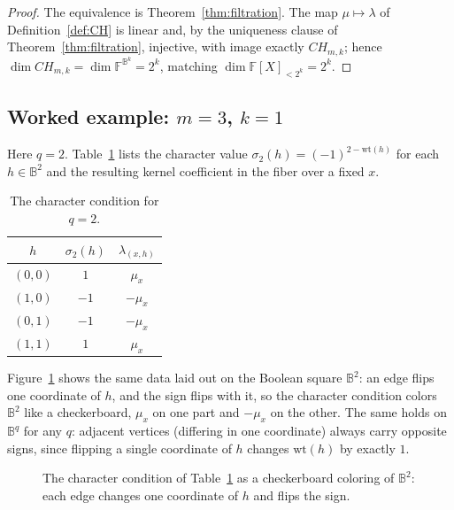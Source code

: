 \documentclass[preprint,3p,12pt,numbers]{elsarticle}
\theoremstyle{definition}
\theoremstyle{remark}
\newcommand{\wt}{\mathrm{wt}}
\begin{document}
\begin{proof}
The equivalence is Theorem~\ref{thm:filtration}. The map
$\mu \mapsto \lambda$ of Definition~\ref{def:CH} is linear and, by the
uniqueness clause of Theorem~\ref{thm:filtration}, injective, with image
exactly $CH_{m,k}$; hence $\dim CH_{m,k} = \dim \mathbb{F}^{\mathbb{B}^k}
= 2^k$, matching $\dim \mathbb{F}[X]_{<2^k}=2^k$.
\end{proof}

\subsection{Worked example: $m=3$, $k=1$}
\label{subsec:example-filt}

Here $q=2$. Table~\ref{tab:example} lists the character value
$\sigma_2(h)=(-1)^{2-\wt(h)}$ for each $h \in \mathbb{B}^2$ and the
resulting kernel coefficient in the fiber over a fixed $x$.

\begin{table}[h]
\centering
\begin{tabular}{ccc}
\toprule
$h$ & $\sigma_2(h)$ & $\lambda_{(x,h)}$ \\
\midrule
$(0,0)$ & $1$  & $\mu_x$  \\
$(1,0)$ & $-1$ & $-\mu_x$ \\
$(0,1)$ & $-1$ & $-\mu_x$ \\
$(1,1)$ & $1$  & $\mu_x$  \\
\bottomrule
\end{tabular}
\caption{The character condition for $q=2$.}
\label{tab:example}
\end{table}

Figure~\ref{fig:cube} shows the same data laid out on the Boolean square
$\mathbb{B}^2$: an edge flips one coordinate of $h$, and the sign flips
with it, so the character condition colors $\mathbb{B}^2$ like a
checkerboard, $\mu_x$ on one part and $-\mu_x$ on the other. The same
holds on $\mathbb{B}^q$ for any $q$: adjacent vertices (differing in one
coordinate) always carry opposite signs, since flipping a single
coordinate of $h$ changes $\wt(h)$ by exactly $1$.

\begin{figure}[h]
\centering
{}
\caption{The character condition of Table~\ref{tab:example} as a
checkerboard coloring of $\mathbb{B}^2$: each edge changes one coordinate
of $h$ and flips the sign.}
\label{fig:cube}
\end{figure}
\end{document}
